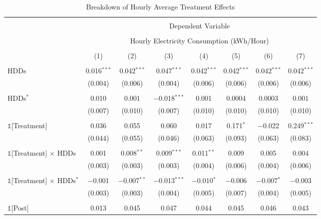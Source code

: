 
\begin{table}[!htbp] \centering 
  \caption{Breakdown of Hourly Average Treatment Effects}
  \label{Table:Breakdown-of-Hourly-ATEs} 
\small 
\begin{tabular}{@{\extracolsep{10pt}}lccccccc} 
\\[-1.8ex]\hline 
\hline \\[-1.8ex] 
 & \multicolumn{7}{c}{Dependent Variable} \\ 
\cline{2-8} 
\\[-1.8ex] & \multicolumn{7}{c}{Hourly Electricity Consumption  (kWh/Hour)} \\ 
\\[-1.8ex] & (1) & (2) & (3) & (4) & (5) & (6) & (7)\\ 
\hline \\[-1.8ex] 
 HDDs & 0.016$^{***}$ & 0.042$^{***}$ & 0.047$^{***}$ & 0.042$^{***}$ & 0.042$^{***}$ & 0.042$^{***}$ & 0.042$^{***}$ \\ 
  & (0.004) & (0.006) & (0.004) & (0.006) & (0.006) & (0.006) & (0.006) \\ 
  & & & & & & & \\ 
 HDDs$^{*}$ & 0.010 & 0.001 & $-$0.018$^{***}$ & 0.001 & 0.0004 & 0.0003 & 0.001 \\ 
  & (0.007) & (0.010) & (0.007) & (0.010) & (0.010) & (0.010) & (0.010) \\ 
  & & & & & & & \\ 
 $\mathbb{1}$[Treatment] & 0.036 & 0.055 & 0.060 & 0.017 & 0.171$^{*}$ & $-$0.022 & 0.249$^{***}$ \\ 
  & (0.044) & (0.055) & (0.046) & (0.063) & (0.093) & (0.063) & (0.083) \\ 
  & & & & & & & \\ 
 $\mathbb{1}$[Treatment] $\times$ HDDs & 0.001 & 0.008$^{**}$ & 0.009$^{***}$ & 0.011$^{**}$ & 0.009 & 0.005 & 0.004 \\ 
  & (0.003) & (0.003) & (0.003) & (0.004) & (0.006) & (0.004) & (0.006) \\ 
  & & & & & & & \\ 
 $\mathbb{1}$[Treatment] $\times$ HDDs$^{*}$ & $-$0.001 & $-$0.007$^{**}$ & $-$0.013$^{***}$ & $-$0.010$^{*}$ & $-$0.006 & $-$0.007$^{*}$ & $-$0.003 \\ 
  & (0.003) & (0.003) & (0.004) & (0.005) & (0.007) & (0.004) & (0.005) \\ 
  & & & & & & & \\ 
 $\mathbb{1}$[Post] & 0.013 & 0.045 & 0.047 & 0.044 & 0.045 & 0.046 & 0.043 \\ 

\end{tabular}
\end{table}
